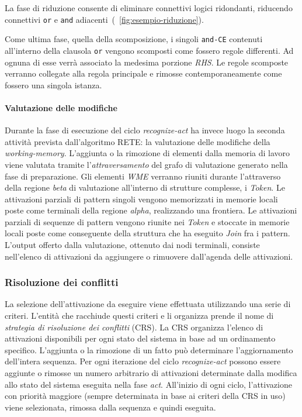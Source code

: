 La fase di riduzione consente di eliminare connettivi logici ridondanti, riducendo connettivi \texttt{or} e \texttt{and} adiacenti~(\figurename~\ref{fig:esempio-riduzione}).

Come ultima fase, quella della scomposizione, i singoli \texttt{and-CE} contenuti all'interno della clausola \texttt{or} vengono scomposti come fossero regole differenti. Ad ognuna di esse verrà associato la medesima porzione \emph{RHS}. Le regole scomposte verranno collegate alla regola principale e rimosse contemporaneamente come fossero una singola istanza.


\paragraph{Valutazione delle modifiche}

Durante la fase di esecuzione del ciclo \emph{recognize-act} ha invece luogo la seconda attività prevista dall'algoritmo RETE: la valutazione delle modifiche della \emph{working-memory}. L'aggiunta o la rimozione di elementi dalla memoria di lavoro viene valutata tramite l'\emph{attraversamento} del grafo di valutazione generato nella fase di preparazione. Gli elementi \emph{WME} verranno riuniti durante l'attraverso della regione \emph{beta} di valutazione all'interno di strutture complesse, i \emph{Token}.
Le attivazioni parziali di pattern singoli vengono memorizzati in memorie locali poste come terminali della regione \emph{alpha}, realizzando una frontiera.
Le attivazioni parziali di sequenze di pattern vengono riunite nei \emph{Token} e stoccate in memorie locali poste come conseguente della struttura che ha eseguito \emph{Join} fra i pattern.
L'output offerto dalla valutazione, ottenuto dai nodi terminali, consiste nell'elenco di attivazioni da aggiungere o rimuovere dall'agenda delle attivazioni.

\subsubsection{Risoluzione dei conflitti}\label{par:strategie-crs}

La selezione dell'attivazione da eseguire viene effettuata utilizzando una serie di criteri. L'entità che racchiude questi criteri e li organizza prende il nome di \emph{strategia di risoluzione dei conflitti} (CRS). La CRS organizza l'elenco di attivazioni disponibili per ogni stato del sistema in base ad un ordinamento specifico. L'aggiunta o la rimozione di un fatto può determinare l'aggiornamento dell'intera sequenza. Per ogni iterazione del ciclo \emph{recognize-act} possono essere aggiunte o rimosse un numero arbitrario di attivazioni determinate dalla modifica allo stato del sistema eseguita nella fase \emph{act}. All'inizio di ogni ciclo, l'attivazione con priorità maggiore (sempre determinata in base ai criteri della CRS in uso) viene selezionata, rimossa dalla sequenza e quindi eseguita.

